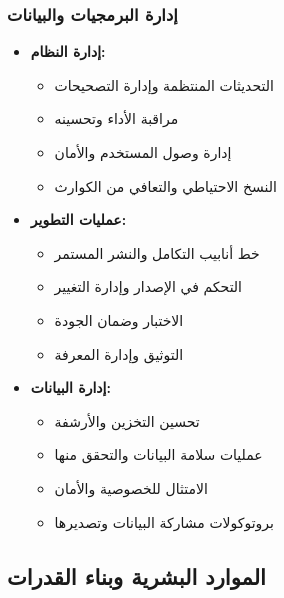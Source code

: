 \subsubsection{إدارة البرمجيات والبيانات}
\begin{itemize}
    \item \textbf{إدارة النظام:}
    \begin{itemize}
        \item التحديثات المنتظمة وإدارة التصحيحات
        \item مراقبة الأداء وتحسينه
        \item إدارة وصول المستخدم والأمان
        \item النسخ الاحتياطي والتعافي من الكوارث
    \end{itemize}
    
    \item \textbf{عمليات التطوير:}
    \begin{itemize}
        \item خط أنابيب التكامل والنشر المستمر
        \item التحكم في الإصدار وإدارة التغيير
        \item الاختبار وضمان الجودة
        \item التوثيق وإدارة المعرفة
    \end{itemize}
    
    \item \textbf{إدارة البيانات:}
    \begin{itemize}
        \item تحسين التخزين والأرشفة
        \item عمليات سلامة البيانات والتحقق منها
        \item الامتثال للخصوصية والأمان
        \item بروتوكولات مشاركة البيانات وتصديرها
    \end{itemize}
\end{itemize}

\subsection{الموارد البشرية وبناء القدرات}

